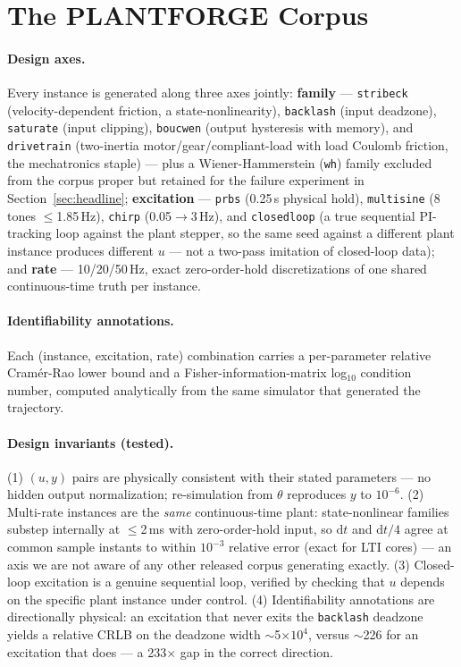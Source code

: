 \documentclass{article}
\begin{document}
\section{The PLANTFORGE Corpus}
\label{sec:corpus}

\paragraph{Design axes.} Every instance is generated along three axes jointly:
\textbf{family} --- \texttt{stribeck} (velocity-dependent friction, a
state-nonlinearity), \texttt{backlash} (input deadzone), \texttt{saturate}
(input clipping), \texttt{boucwen} (output hysteresis with memory), and
\texttt{drivetrain} (two-inertia motor/gear/compliant-load with load Coulomb
friction, the mechatronics staple) --- plus a Wiener-Hammerstein (\texttt{wh})
family excluded from the corpus proper but retained for the failure experiment
in Section~\ref{sec:headline}; \textbf{excitation} --- \texttt{prbs} (0.25\,s
physical hold), \texttt{multisine} (8 tones $\leq$1.85\,Hz), \texttt{chirp}
(0.05$\to$3\,Hz), and \texttt{closedloop} (a true sequential PI-tracking loop
against the plant stepper, so the same seed against a different plant instance
produces different $u$ --- not a two-pass imitation of closed-loop data); and
\textbf{rate} --- 10/20/50\,Hz, exact zero-order-hold discretizations of one
shared continuous-time truth per instance.

\paragraph{Identifiability annotations.} Each (instance, excitation, rate)
combination carries a per-parameter relative Cram\'er-Rao lower bound and a
Fisher-information-matrix log$_{10}$ condition number, computed analytically
from the same simulator that generated the trajectory.

\paragraph{Design invariants (tested).} (1) $(u,y)$ pairs are physically
consistent with their stated parameters --- no hidden output normalization;
re-simulation from $\theta$ reproduces $y$ to $10^{-6}$. (2) Multi-rate
instances are the \emph{same} continuous-time plant: state-nonlinear families
substep internally at $\leq$2\,ms with zero-order-hold input, so $\mathrm{d}t$
and $\mathrm{d}t/4$ agree at common sample instants to within $10^{-3}$ relative
error (exact for LTI cores) --- an axis we are not aware of any other released
corpus generating exactly. (3) Closed-loop excitation is a genuine sequential
loop, verified by checking that $u$ depends on the specific plant instance under
control. (4) Identifiability annotations are directionally physical: an
excitation that never exits the \texttt{backlash} deadzone yields a relative
CRLB on the deadzone width $\sim$5$\times10^4$, versus $\sim$226 for an
excitation that does --- a 233$\times$ gap in the correct direction.
\end{document}
